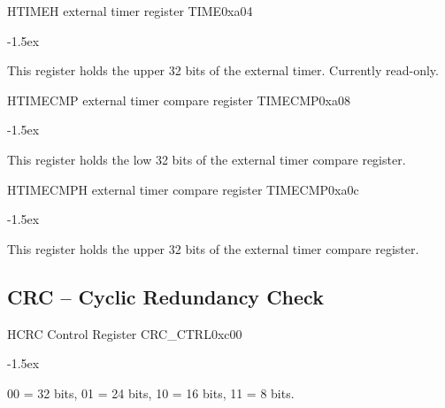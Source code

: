 \documentclass[12pt]{article}
\begin{document}
\begin{register}{H}{TIMEH external timer register TIME}{0xa04}
\label{timeh}
\regnewline%
\end{register}
\begin{regdesc}[0.8\textwidth]\begin{reglist}[00000]
\itemsep-1.5ex
\item [TIMEH] This register holds the upper 32 bits of the external timer. Currently read-only.
\end{reglist}\end{regdesc}

\begin{register}{H}{TIMECMP external timer compare register TIMECMP}{0xa08}
\label{timecmp}
\regnewline%
\end{register}
\begin{regdesc}[0.8\textwidth]\begin{reglist}[00000000]
\itemsep-1.5ex
\item [TIMECMP] This register holds the low 32 bits of the external timer compare register.
\end{reglist}\end{regdesc}

\begin{register}{H}{TIMECMPH external timer compare register TIMECMP}{0xa0c}
\label{timecmph}
\regnewline%
\end{register}
\begin{regdesc}[0.8\textwidth]\begin{reglist}[000000000]
\itemsep-1.5ex
\item [TIMECMPH] This register holds the upper 32 bits of the external timer compare register.
\end{reglist}\end{regdesc}

\subsection{CRC -- Cyclic Redundancy Check}
\begin{register}{H}{CRC Control Register CRC\_CTRL}{0xc00}
\label{crcctrl}
%
%
%
\regnewline%
\end{register}
\begin{regdesc}[0.8\textwidth]\begin{reglist}[000000000]
\itemsep-1.5ex
\item [SIZE] 00 = 32 bits, 01 = 24 bits, 10 = 16 bits, 11 = 8 bits.
\end{reglist}\end{regdesc}
\end{document}
